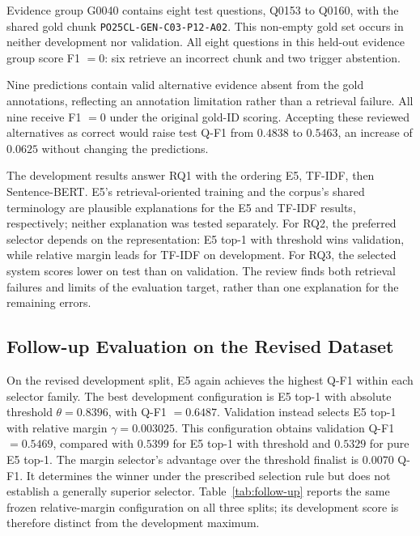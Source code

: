 \documentclass[11pt]{article}
\begin{document}
Evidence group G0040 contains eight test questions, Q0153 to Q0160, with the shared gold chunk \texttt{PO25CL-GEN-C03-P12-A02}. This non-empty gold set occurs in neither development nor validation. All eight questions in this held-out evidence group score F1 $=0$: six retrieve an incorrect chunk and two trigger abstention.

Nine predictions contain valid alternative evidence absent from the gold annotations, reflecting an annotation limitation rather than a retrieval failure. All nine receive F1 $=0$ under the original gold-ID scoring. Accepting these reviewed alternatives as correct would raise test Q-F1 from $0.4838$ to $0.5463$, an increase of $0.0625$ without changing the predictions.

The development results answer RQ1 with the ordering E5, TF-IDF, then Sentence-BERT. E5's retrieval-oriented training and the corpus's shared terminology are plausible explanations for the E5 and TF-IDF results, respectively; neither explanation was tested separately. For RQ2, the preferred selector depends on the representation: E5 top-1 with threshold wins validation, while relative margin leads for TF-IDF on development. For RQ3, the selected system scores lower on test than on validation. The review finds both retrieval failures and limits of the evaluation target, rather than one explanation for the remaining errors.

\subsection{Follow-up Evaluation on the Revised Dataset}
\label{sec:follow-up}

On the revised development split, E5 again achieves the highest Q-F1 within each selector family. The best development configuration is E5 top-1 with absolute threshold $\theta=0.8396$, with Q-F1 $=0.6487$. Validation instead selects E5 top-1 with relative margin $\gamma=0.003025$. This configuration obtains validation Q-F1 $=0.5469$, compared with $0.5399$ for E5 top-1 with threshold and $0.5329$ for pure E5 top-1. The margin selector's advantage over the threshold finalist is $0.0070$ Q-F1. It determines the winner under the prescribed selection rule but does not establish a generally superior selector. Table~\ref{tab:follow-up} reports the same frozen relative-margin configuration on all three splits; its development score is therefore distinct from the development maximum.
\end{document}
